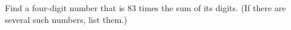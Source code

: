 Find a four-digit number that is $83$ times the sum of its digits. (If there are several such numbers, list them.)
